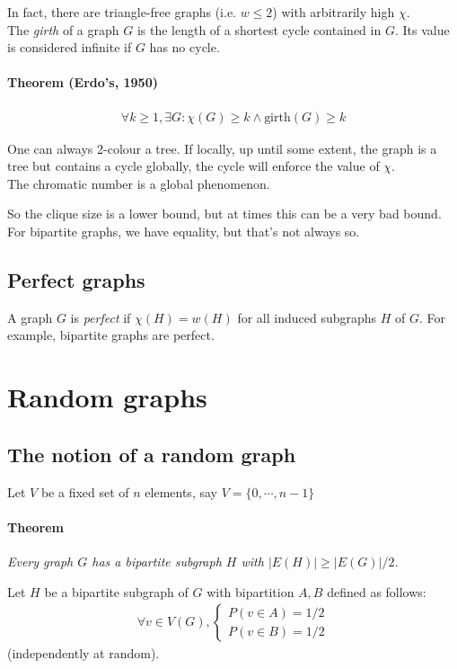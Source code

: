 \documentclass[11pt]{book}
\begin{document}
	In fact, there are triangle-free graphs (i.e. $w \leq 2$) with arbitrarily high $\chi$.\\
	
	The \textit{girth} of a graph $G$ is the length of a shortest cycle contained in $G$. Its value is considered infinite if $G$ has no cycle.
	
		\subsubsection{Theorem (Erdo's, 1950)}
		\begin{eqnarray}
			\forall k \geq 1, \exists G : \chi(G) \geq k \wedge \text{girth}(G) \geq k
		\end{eqnarray}
		
		One can always 2-colour a tree. If locally, up until some extent, the graph is a tree but contains a cycle globally, the cycle will enforce the value of $\chi$.\\
		
		The chromatic number is a global phenomenon.
		
	So the clique size is a lower bound, but at times this can be a very bad bound. For bipartite graphs, we have equality, but that's not always so.
	
	\section{Perfect graphs}
		A graph $G$ is \textit{perfect} if $\chi(H) = w(H)$ for all induced subgraphs $H$ of $G$. For example, bipartite graphs are perfect.
		
		
\chapter{Random graphs}

\section{The notion of a random graph}
Let $V$ be a fixed set of $n$ elements, say $V = \{0, \dotsb, n-1\}$
\subsubsection{Theorem}
\textit{Every graph $G$ has a bipartite subgraph $H$ with $|E(H)| \geq |E(G)|/2$.\\}

Let $H$ be a bipartite subgraph of $G$ with bipartition $A,B$ defined as follows:
\begin{eqnarray}
	\forall v \in V(G), \begin{cases}
		P(v \in A) = 1/2 \\
		P(v \in B) = 1/2 
	\end{cases}
\end{eqnarray}
(independently at random).\\
\end{document}
